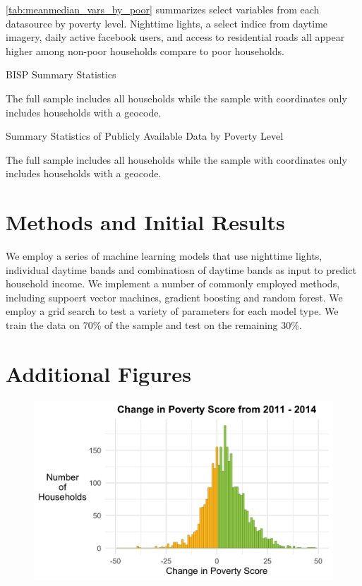 \documentclass[8pt, oneside]{article}
\begin{document}
\autoref{tab:meanmedian_vars_by_poor} summarizes select variables from each datasource by poverty level. Nighttime lights, a select indice from daytime imagery, daily active facebook users, and access to residential roads all appear higher among non-poor households compare to poor households. 

\begin{table}[H]
\caption{BISP Summary Statistics}
\label{tab:bisp_sum_stat}
\centering

\flushleft \footnotesize The full sample includes all households while the sample with coordinates only includes households with a geocode.
\end{table}

\begin{table}[H]
\caption{Summary Statistics of Publicly Available Data by Poverty Level}
\label{tab:meanmedian_vars_by_poor}
\centering

\flushleft \footnotesize The full sample includes all households while the sample with coordinates only includes households with a geocode.
\end{table}

\section{Methods and Initial Results}
We employ a series of machine learning models that use nighttime lights, individual daytime bands and combinatiosn of daytime bands as input to predict household income. We implement a number of commonly employed methods, including suppoert vector machines, gradient boosting and random forest. We employ a grid search to test a variety of parameters for each model type. We train the data on 70\% of the sample and test on the remaining 30\%. 

\newpage
\appendix

\section{Additional Figures}

\begin{figure}[H]
      \caption{} 
       \label{fig:pscore_change_hist}
       \centering
             \includegraphics[width=.6\textwidth]{Figures/pscore_changes_r13.png}       
\end{figure}
\end{document}

